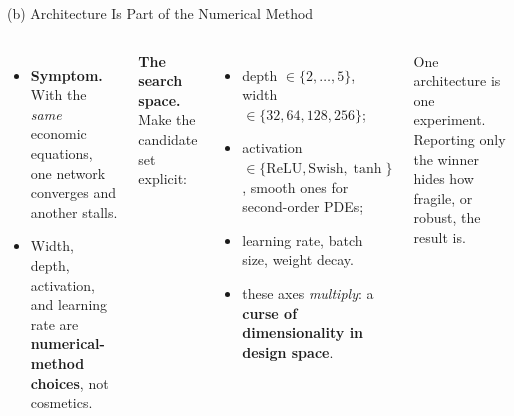 \documentclass[aspectratio=169,11pt]{beamer}
\newcommand{\lemph}[1]{{\color{uzhblue}\bfseries #1}}
\begin{document}
\begin{frame}{(b) Architecture Is Part of the Numerical Method}
\begin{columns}[T,onlytextwidth]
\begin{itemize}\setlength\itemsep{2pt}
  \item \textbf{\color{uzhblue}Symptom.} With the \emph{same} economic equations,
        one network converges and another stalls.
  \item Width, depth, activation, and learning rate are
        \lemph{numerical-method choices}, not cosmetics.
\end{itemize}
\vspace{0.3em}

\textbf{\color{uzhblue}The search space.} Make the candidate set explicit:
\begin{itemize}\setlength\itemsep{2pt}\footnotesize
  \item depth $\in\{2,\dots,5\}$, width $\in\{32,64,128,256\}$;
  \item activation $\in\{\mathrm{ReLU},\mathrm{Swish},\tanh\}$, smooth ones for
        second-order PDEs;
  \item learning rate, batch size, weight decay.
  \item these axes \emph{multiply}: a \lemph{curse of dimensionality in design
        space}.
\end{itemize}
\begin{pitfall}
\small One architecture is one experiment. Reporting only the winner hides how
fragile, or robust, the result is.
\end{pitfall}
\end{columns}
\end{frame}
\end{document}
